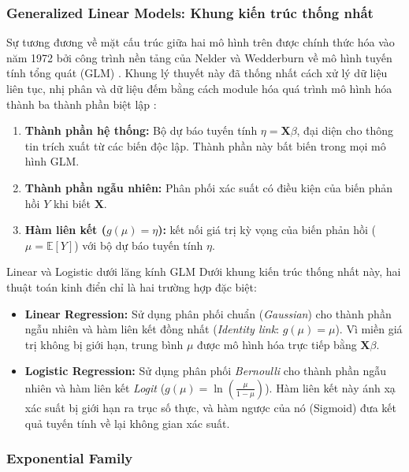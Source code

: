 \subsubsection{Generalized Linear Models: Khung kiến trúc thống nhất}

Sự tương đương về mặt cấu trúc giữa hai mô hình trên được chính thức hóa vào năm 1972 bởi công trình nền tảng của Nelder và Wedderburn về mô hình tuyến tính tổng quát (GLM) \cite{nelder1972generalized}. Khung lý thuyết này đã thống nhất cách xử lý dữ liệu liên tục, nhị phân và dữ liệu đếm bằng cách module hóa quá trình mô hình hóa thành ba thành phần biệt lập \cite{ahmed2023comprehensive}:

\begin{enumerate}
    \item \textbf{Thành phần hệ thống:} Bộ dự báo tuyến tính $\eta = \mathbf{X}\beta$, đại diện cho thông tin trích xuất từ các biến độc lập. Thành phần này bất biến trong mọi mô hình GLM.
    \item \textbf{Thành phần ngẫu nhiên:} Phân phối xác suất có điều kiện của biến phản hồi $Y$ khi biết $\mathbf{X}$.
    \item \textbf{Hàm liên kết ($g(\mu) = \eta$):} kết nối giá trị kỳ vọng của biến phản hồi ($\mu = \mathbb{E}[Y]$) với bộ dự báo tuyến tính $\eta$.
\end{enumerate}

\begin{importantbox}{Linear và Logistic dưới lăng kính GLM}
Dưới khung kiến trúc thống nhất này, hai thuật toán kinh điển chỉ là hai trường hợp đặc biệt:
\begin{itemize}
    \item \textbf{Linear Regression:} Sử dụng phân phối chuẩn (\textit{Gaussian}) cho thành phần ngẫu nhiên và hàm liên kết đồng nhất (\textit{Identity link}: $g(\mu) = \mu$). Vì miền giá trị không bị giới hạn, trung bình $\mu$ được mô hình hóa trực tiếp bằng $\mathbf{X}\beta$.
    \item \textbf{Logistic Regression:} Sử dụng phân phối \textit{Bernoulli} cho thành phần ngẫu nhiên và hàm liên kết \textit{Logit} ($g(\mu) = \ln(\frac{\mu}{1-\mu})$). Hàm liên kết này ánh xạ xác suất bị giới hạn ra trục số thực, và hàm ngược của nó (Sigmoid) đưa kết quả tuyến tính về lại không gian xác suất.
\end{itemize}
\end{importantbox}

\subsubsection{Exponential Family}

